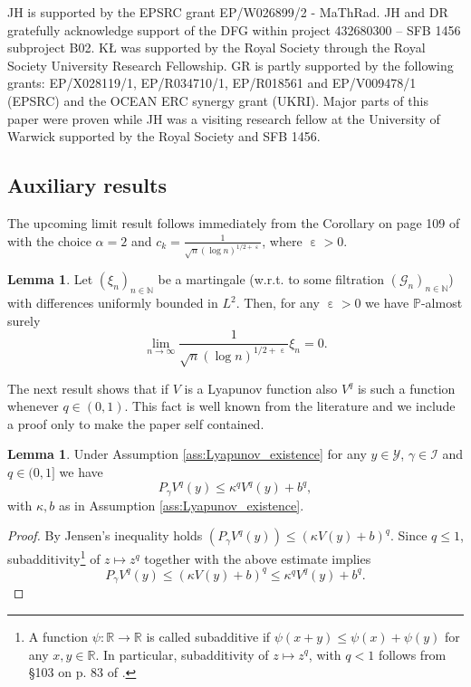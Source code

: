 \documentclass[12pt]{article}
\theoremstyle{definition}
\newtheorem{lem}[thm]{Lemma}
\newcommand{\N}{\mathbb{N}}
\newcommand{\R}{\mathbb{R}}
\newcommand{\cY}{\mathcal{Y}}
\DeclareMathOperator{\eps}{\varepsilon}
\begin{document}
{JH is supported by the EPSRC grant EP/W026899/2 - MaThRad.}
JH and DR gratefully acknowledge support
of the DFG within project 432680300 – SFB 1456 subproject B02. K{\L} was supported by the Royal Society through the Royal Society University Research Fellowship. 
GR is partly supported by the following grants: 
EP/X028119/1, EP/R034710/1, EP/R018561 and EP/V009478/1 (EPSRC) and the OCEAN ERC synergy grant (UKRI).
Major parts of this paper were proven while JH was a visiting research fellow at the University of Warwick supported by the Royal Society and SFB 1456.





\begin{appendix}
\section{Auxiliary results}
\label{app1}
\renewcommand{\thesection}{\Alph{section}}
\setcounter{section}{1}		
The upcoming limit result follows immediately from the Corollary on page 109 of \cite{chow1960martingale} with the choice $\alpha = 2$ and $c_k = \frac{1}{\sqrt{n} (\log n)^{1/2 + \eps}}$, where $\eps>0$. 
\begin{lem}\label{lem:martingale_almost_sure_convergence}
	Let $(\xi_n)_{n \in \N}$ be a martingale (w.r.t. to some filtration $(\mathcal{G}_n)_{n \in \N}$) with differences uniformly bounded in $L^2$. 
	Then, for any $\eps>0$ we have $\mathbb{P}$-almost surely 
	\[
	\lim_{n \to \infty} \frac{1}{\sqrt{n}(\log n)^{1/2 + \eps}} \xi_n =0  .
	\]
\end{lem}	


The next result shows that if $V$ is a Lyapunov function also $V^q$ is such  a function whenever $q\in (0,1)$. 
This fact is well known from the literature and we include a proof only to make the paper self contained.  

\begin{lem}\label{lem:Lyapunov_function_exponent}
	Under Assumption \ref{ass:Lyapunov_existence} for any $y \in \cY$, $\gamma \in \mathcal{I}$ and $q \in (0,1]$ we have 
	\[
	P_\gamma V^{q}(y) \leq \kappa^q V^{q}(y) +  b^q,
	\]
	with $\kappa, b$ as in Assumption \ref{ass:Lyapunov_existence}.
\end{lem}

\begin{proof}
	By Jensen's inequality holds $(P_\gamma V^{q}(y)) \leq (\kappa V(y) + b)^q$.
	Since $q\leq 1$, subadditivity\footnote{A function $\psi \colon \R \to \R $ is called subadditive if $\psi(x+y) \leq \psi(x) + \psi(y)$ for any $x,y \in \R$. In particular, subadditivity of $z \mapsto z^q$, with $q <1$ follows from §103 on p. 83 of \cite{hardy1952inequalities}.} of $z \mapsto z^q$ together with the above estimate implies
	\[
	P_\gamma V^{q}(y) \leq \left( \kappa V(y) + b \right)^{q} \leq \kappa^q V^{q}(y) + b^q.
	\] 
\end{proof}




\end{appendix}
\end{document}
